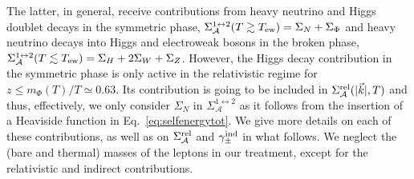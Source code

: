 \documentclass[12pt, a4paper]{article}
\begin{document}
The latter, in general, receive contributions from heavy neutrino and Higgs doublet decays in the symmetric phase, $\Sigma_\mathcal{A}^{1\leftrightarrow 2}(T\gtrsim T_{\rm ew})= \Sigma_N + \Sigma_\Phi$  and heavy neutrino decays into Higgs and electroweak bosons in the broken phase, $\Sigma_{\mathcal{A}}^{1\leftrightarrow 2} (T\lesssim T_{\rm ew})= \Sigma_H + 2\Sigma_W + \Sigma_Z$. However, the Higgs decay contribution in the symmetric phase is only active in the relativistic regime for $z \leq m_\Phi(T)/T\simeq 0.63$. Its contribution is going to be included in $\Sigma_\mathcal{A}^{\rm rel}(|\vec{k}|, T)$ and thus, effectively, we only consider $\Sigma_N$ in $\Sigma_{\mathcal{A}}^{1\leftrightarrow 2}$ as it follows from the insertion of a Heaviside function in Eq.~\eqref{eq:selfenergytot}. We give more details on each of these contributions, as well as on $\Sigma_\mathcal{A}^{\rm rel}$ and $\gamma_\pm^{\rm ind}$ in what follows. We neglect the (bare and thermal) masses of the leptons in our treatment, except for the relativistic and indirect contributions.
\end{document}
